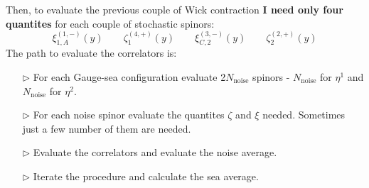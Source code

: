 \documentclass[11pt,a4paper]{article}
\begin{document}
Then, to evaluate the previous couple of Wick contraction {\bf I need only four quantites} for each couple of stochastic spinors:
\begin{equation*}
    \xi^{(1,-)}_{1,A} (y) \qquad  \zeta^{(4,+)}_1 (y) \qquad \xi^{(3,-)}_{C,2} (y) \qquad  \zeta^{(2,+)}_2 (y)
\end{equation*}
The path to evaluate the correlators is:
\begin{itemize}
    \item [$\triangleright$] For each Gauge-sea configuration evaluate 2$N_{\text{noise}}$ spinors - $N_{\text{noise}}$ for $\eta^1$ and $N_{\text{noise}}$ for $\eta^2$. 
    \item [$\triangleright$] For each noise spinor evaluate the quantites $\zeta$ and $\xi$ needed. Sometimes just a few number of them are needed.
    \item [$\triangleright$] Evaluate the correlators and evaluate the noise average.
    \item [$\triangleright$] Iterate the procedure and calculate the sea average.
\end{itemize}
\end{document}
